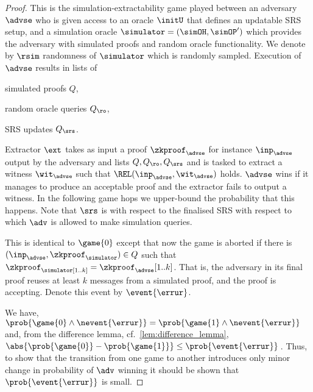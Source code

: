 \begin{proof}		
	
	 This is the simulation-extractability game played between an adversary
	$\advse$ who is given access to an oracle $\initU$ that defines an updatable SRS
	setup, and a simulation oracle $\simulator = (\simOH, \simOP')$ which provides the adversary with simulated
	proofs and random oracle functionality. We denote by $\rsim$
	randomness of $\simulator$ which is randomly sampled. Execution of $\advse$ results in
	lists of
	\begin{inparaenum}[(1)]
		\item simulated proofs $Q$,
		\item random oracle queries $Q_\ro$,
		\item SRS updates $Q_\srs$.
	\end{inparaenum}
	Extractor $\ext$ takes as input a proof $\zkproof_{\advse}$ for instance
	$\inp_{\advse}$ output by the adversary and lists $Q, Q_\ro, Q_\srs$ and is tasked
	to extract a witness $\wit_{\advse}$ such that $\REL(\inp_{\advse}, \wit_{\advse})$
	holds. $\advse$ wins if it manages to produce an acceptable proof and the extractor
	fails to output a witness. In the following game hops we upper-bound the
	probability that this happens. Note that $\srs$ is with respect to the finalised
	SRS with respect to which $\adv$ is allowed to make simulation queries.
	
	 This is identical to $\game{0}$ except that now the game is aborted if
	there is $(\inp_\advse, \zkproof_{\simulator}) \in Q$ such that
	$\zkproof_\simulator[1..k] = \zkproof_{\advse}[1..k]$. That is, the adversary in
	its final proof reuses at least $k$ messages from a simulated proof, and the proof
	is accepting.  Denote this event by $\event{\errur}$.
	
	 We have,
	\( \prob{\game{0} \land \nevent{\errur}} = \prob{\game{1} \land \nevent{\errur}} \)
	and, from the difference lemma, cf.~\cref{lem:difference_lemma},
	$ \abs{\prob{\game{0}} - \prob{\game{1}}} \leq \prob{\event{\errur}}\,$.  Thus, to
	show that the transition from one game to another introduces only minor change in
	probability of $\adv$ winning it should be shown that $\prob{\event{\errur}}$ is
	small.
	

\end{proof}
